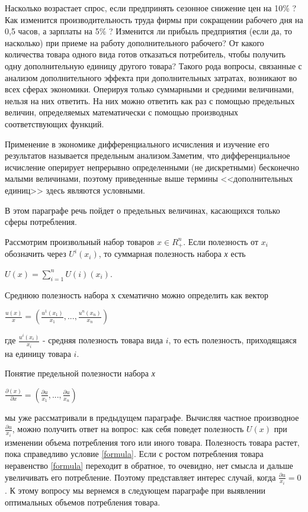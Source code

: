 \documentclass[12pt, 4paper]{book}
\begin{document}
{Насколько возрастает спрос, если предпринять сезонное снижение цен на 10\% ? Как изменится производительность труда фирмы при сокращении рабочего дня на 0,5 часов, а зарплаты на 5\% ? Изменится ли прибыль предприятия (если да, то насколько) при приеме на работу дополнительного рабочего? От какого количества товара одного вида готов отказаться потребитель, чтобы получить одну дополнительную единицу другого товара? Такого рода вопросы, связанные с анализом дополнительного эффекта при дополнительных затратах, возникают во всех сферах экономики. Оперируя только суммарными и средними величинами, нельзя на них ответить. На них можно ответить как раз с помощью предельных величин, определяемых математически с помощью производных соответствующих функций.
\par
Применение в экономике дифференциального исчисления и изучение его результатов называется предельным анализом.Заметим, что дифференциальное исчисление оперирует непрерывно определенными (не дискретными) бесконечно малыми величинами, поэтому приведенные выше термины <<дополнительных единиц>> здесь являются условными.
\par
В этом параграфе речь пойдет о предельных величинах, касающихся только сферы потребления.
\par
Рассмотрим произвольный набор товаров $x\in R_{+}^{n}$. Если полезность от $x_{i}$ обозначить через $U^i(x_{i})$, то суммарная полезность набора \textit{х} есть 
\begin{center}
$U(x)=\sum\limits_{i=1}^{n} U(i)(x_{i})$.
\end{center}
\par
Среднюю полезность набора х схематично можно определить как вектор 
\begin{center}
$\frac{u(x)}{x}=\left(\frac{u^{1}(x_{1})}{x_{1}},...,\frac{u^n(x_{n})}{x_{n}}\right)$
\end{center}
где $\frac{u^i(x_{i})}{x_{i}}$ - средняя полезность товара вида $i$, то есть полезность, приходящаяся на единицу товара $i$.
\par
Понятие предельной полезности набора \textit{х} 
\begin{center}
$\frac{\partial(x)}{\partial x}=\left(\frac{\partial u}{x_{1}},...,\frac{\partial u}{x_{n}}\right)$
\end{center}
мы уже рассматривали в предыдущем параграфе. Вычисляя частное производное $\frac{\partial u}{x_{i}}$, можно получить ответ на вопрос: как себя поведет полезность $U(x)$ при изменении объема потребления того или иного товара. Полезность товара растет, пока справедливо условие \ref{formula}. Если с ростом потребления товара неравенство \ref{formula} переходит в обратное, то очевидно, нет смысла и дальше увеличивать его потребление. Поэтому представляет интерес случай, когда $\frac{\partial u}{x_{i}}=0$. К этому вопросу мы вернемся в следующем параграфе при выявлении оптимальных объемов потребления товара. 
}
\end{document}
